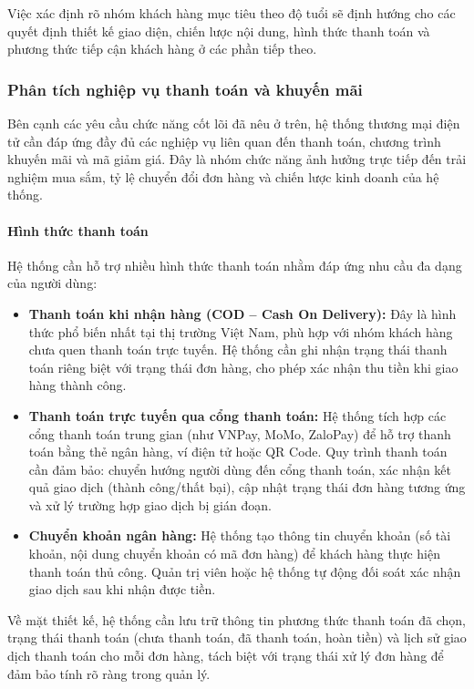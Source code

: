 \documentclass[13pt]{article}
\begin{document}
Việc xác định rõ nhóm khách hàng mục tiêu theo độ tuổi sẽ định hướng cho các quyết định thiết kế giao diện, chiến lược nội dung, hình thức thanh toán và phương thức tiếp cận khách hàng ở các phần tiếp theo.

\subsubsection{Phân tích nghiệp vụ thanh toán và khuyến mãi}

Bên cạnh các yêu cầu chức năng cốt lõi đã nêu ở trên, hệ thống thương mại điện tử cần đáp ứng đầy đủ các nghiệp vụ liên quan đến thanh toán, chương trình khuyến mãi và mã giảm giá. Đây là nhóm chức năng ảnh hưởng trực tiếp đến trải nghiệm mua sắm, tỷ lệ chuyển đổi đơn hàng và chiến lược kinh doanh của hệ thống.

\paragraph{Hình thức thanh toán}
Hệ thống cần hỗ trợ nhiều hình thức thanh toán nhằm đáp ứng nhu cầu đa dạng của người dùng:

\begin{itemize}
    \item \textbf{Thanh toán khi nhận hàng (COD -- Cash On Delivery):} Đây là hình thức phổ biến nhất tại thị trường Việt Nam, phù hợp với nhóm khách hàng chưa quen thanh toán trực tuyến. Hệ thống cần ghi nhận trạng thái thanh toán riêng biệt với trạng thái đơn hàng, cho phép xác nhận thu tiền khi giao hàng thành công.
    \item \textbf{Thanh toán trực tuyến qua cổng thanh toán:} Hệ thống tích hợp các cổng thanh toán trung gian (như VNPay, MoMo, ZaloPay) để hỗ trợ thanh toán bằng thẻ ngân hàng, ví điện tử hoặc QR Code. Quy trình thanh toán cần đảm bảo: chuyển hướng người dùng đến cổng thanh toán, xác nhận kết quả giao dịch (thành công/thất bại), cập nhật trạng thái đơn hàng tương ứng và xử lý trường hợp giao dịch bị gián đoạn.
    \item \textbf{Chuyển khoản ngân hàng:} Hệ thống tạo thông tin chuyển khoản (số tài khoản, nội dung chuyển khoản có mã đơn hàng) để khách hàng thực hiện thanh toán thủ công. Quản trị viên hoặc hệ thống tự động đối soát xác nhận giao dịch sau khi nhận được tiền.
\end{itemize}

Về mặt thiết kế, hệ thống cần lưu trữ thông tin phương thức thanh toán đã chọn, trạng thái thanh toán (chưa thanh toán, đã thanh toán, hoàn tiền) và lịch sử giao dịch thanh toán cho mỗi đơn hàng, tách biệt với trạng thái xử lý đơn hàng để đảm bảo tính rõ ràng trong quản lý.
\end{document}
